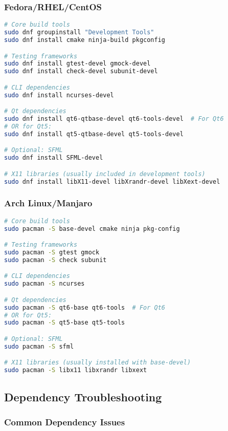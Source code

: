\documentclass[12pt]{article}
\begin{document}
\subsubsection{Fedora/RHEL/CentOS}
\begin{lstlisting}[language=bash]
# Core build tools
sudo dnf groupinstall "Development Tools"
sudo dnf install cmake ninja-build pkgconfig

# Testing frameworks
sudo dnf install gtest-devel gmock-devel
sudo dnf install check-devel subunit-devel

# CLI dependencies
sudo dnf install ncurses-devel

# Qt dependencies
sudo dnf install qt6-qtbase-devel qt6-tools-devel  # For Qt6
# OR for Qt5:
sudo dnf install qt5-qtbase-devel qt5-tools-devel

# Optional: SFML
sudo dnf install SFML-devel

# X11 libraries (usually included in development tools)
sudo dnf install libX11-devel libXrandr-devel libXext-devel
\end{lstlisting}

\subsubsection{Arch Linux/Manjaro}
\begin{lstlisting}[language=bash]
# Core build tools
sudo pacman -S base-devel cmake ninja pkg-config

# Testing frameworks
sudo pacman -S gtest gmock
sudo pacman -S check subunit

# CLI dependencies
sudo pacman -S ncurses

# Qt dependencies
sudo pacman -S qt6-base qt6-tools  # For Qt6
# OR for Qt5:
sudo pacman -S qt5-base qt5-tools

# Optional: SFML
sudo pacman -S sfml

# X11 libraries (usually installed with base-devel)
sudo pacman -S libx11 libxrandr libxext
\end{lstlisting}

\subsection{Dependency Troubleshooting}

\subsubsection{Common Dependency Issues}
\end{document}
